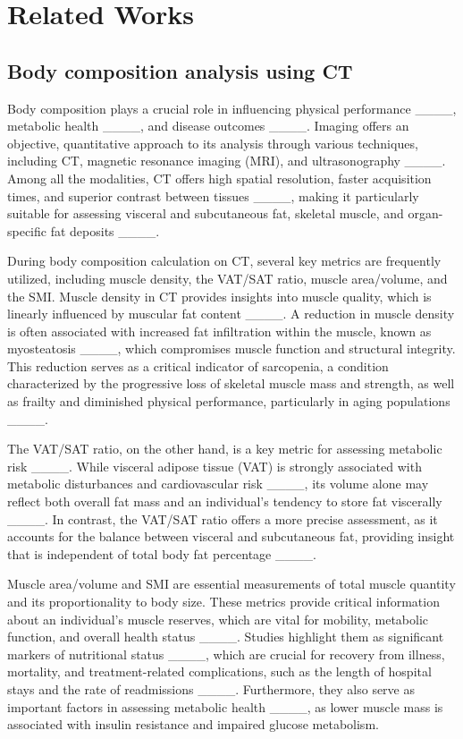 \section{Related Works}
\subsection{Body composition analysis using CT}
Body composition plays a crucial role in influencing physical performance ____, metabolic health ____, and disease outcomes ____. Imaging offers an objective, quantitative approach to its analysis through various techniques, including CT, magnetic resonance imaging (MRI), and ultrasonography ____. Among all the modalities, CT offers high spatial resolution, faster acquisition times, and superior contrast between tissues ____, making it particularly suitable for assessing visceral and subcutaneous fat, skeletal muscle, and organ-specific fat deposits ____. 

During body composition calculation on CT, several key metrics are frequently utilized, including muscle density, the VAT/SAT ratio, muscle area/volume, and the SMI. Muscle density in CT provides insights into muscle quality, which is linearly influenced by muscular fat content ____. A reduction in muscle density is often associated with increased fat infiltration within the muscle, known as myosteatosis ____, which compromises muscle function and structural integrity. This reduction serves as a critical indicator of sarcopenia, a condition characterized by the progressive loss of skeletal muscle mass and strength, as well as frailty and diminished physical performance, particularly in aging populations ____. 

The VAT/SAT ratio, on the other hand, is a key metric for assessing metabolic risk ____. While visceral adipose tissue (VAT) is strongly associated with metabolic disturbances and cardiovascular risk ____, its volume alone may reflect both overall fat mass and an individual's tendency to store fat viscerally ____. In contrast, the VAT/SAT ratio offers a more precise assessment, as it accounts for the balance between visceral and subcutaneous fat, providing insight that is independent of total body fat percentage ____.

Muscle area/volume and SMI are essential measurements of total muscle quantity and its proportionality to body size. These metrics provide critical information about an individual’s muscle reserves, which are vital for mobility, metabolic function, and overall health status ____. Studies highlight them as significant markers of nutritional status ____, which are crucial for recovery from illness, mortality, and treatment-related complications, such as the length of hospital stays and the rate of readmissions ____. Furthermore, they also serve as important factors in assessing metabolic health ____, as lower muscle mass is associated with insulin resistance and impaired glucose metabolism.

